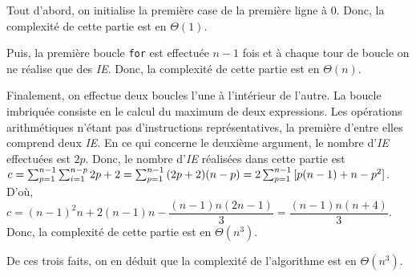 \documentclass[12pt,a4paper]{article}
\begin{document}
Tout d'abord, on initialise la premi\`ere case de la premi\`ere ligne \`a 0. Donc, la complexit\'e de cette partie est en $\Theta(1)$. 

Puis, la premi\`ere boucle \texttt{for} est effectu\'ee \( n-1 \) fois et \`a chaque tour de boucle on ne r\'ealise que des {\itshape IE}. Donc, la complexit\'e de cette partie est en $\Theta(n)$. 

Finalement, on effectue deux boucles l'une \`a l'int\'erieur de l'autre. La boucle imbriqu\'ee consiste en le calcul du maximum de deux expressions. Les op\'erations arithm\'etiques n'\'etant pas d'instructions repr\'esentatives, la premi\`ere d'entre elles comprend deux {\itshape IE}. En ce qui concerne le deuxi\`eme argument, le nombre d'{\itshape IE} effectu\'ees est \( 2p \). Donc, le nombre d'{\itshape IE} r\'ealis\'ees dans cette partie est \( \\c = \sum_{p=1}^{n-1}\sum_{i=1}^{n-p}{2p+2} = \sum_{p=1}^{n-1}{(2p+2)(n-p)} = 2\sum_{p=1}^{n-1}{[p(n-1)+n-p^2]} \). D'o\`u, \( c = (n-1)^2n + 2(n-1)n - \dfrac{(n-1)n(2n-1)}{3} = \dfrac{(n-1)n(n+4)}{3} \). Donc, la complexit\'e de cette partie est en $\Theta(n^3)$.

De ces trois faits, on en d\'eduit que la complexit\'e de l'algorithme est en $\Theta(n^3)$.
\end{document}
